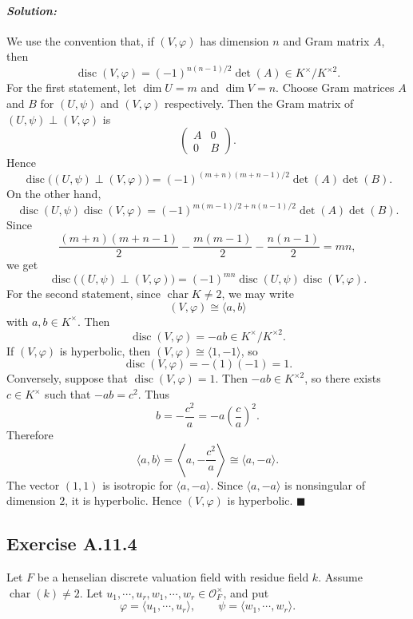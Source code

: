 \documentclass[12pt, a4paper]{article}
\newenvironment{solution}
  {\paragraph{\textit{Solution:}}\par\medskip}
  {\hfill$\blacksquare$\vspace{0.1cm}}
\begin{document}
\begin{solution}
    We use the convention that, if $(V,\varphi)$ has dimension $n$ and Gram matrix $A$, then \[ \operatorname{disc}(V,\varphi) = (-1)^{n(n-1)/2}\det(A) \in K^\times/K^{\times 2}. \] For the first statement, let $\dim U=m$ and $\dim V=n$. Choose Gram matrices $A$ and $B$ for $(U,\psi)$ and $(V,\varphi)$ respectively. Then the Gram matrix of $(U,\psi)\perp (V,\varphi)$ is \[ \begin{pmatrix} A & 0\\ 0 & B \end{pmatrix}. \] Hence \[ \operatorname{disc}\bigl((U,\psi)\perp (V,\varphi)\bigr) = (-1)^{(m+n)(m+n-1)/2}\det(A)\det(B). \] On the other hand, \[ \operatorname{disc}(U,\psi)\operatorname{disc}(V,\varphi) = (-1)^{m(m-1)/2+n(n-1)/2}\det(A)\det(B). \] Since \[ \frac{(m+n)(m+n-1)}{2} - \frac{m(m-1)}{2} - \frac{n(n-1)}{2} = mn, \] we get \[ \operatorname{disc}\bigl((U,\psi)\perp (V,\varphi)\bigr) = (-1)^{mn} \operatorname{disc}(U,\psi)\operatorname{disc}(V,\varphi). \] For the second statement, since $\operatorname{char}K\neq 2$, we may write \[ (V,\varphi)\cong \langle a,b\rangle \] with $a,b\in K^\times$. Then \[ \operatorname{disc}(V,\varphi)=-ab\in K^\times/K^{\times 2}. \] If $(V,\varphi)$ is hyperbolic, then $(V,\varphi)\cong \langle 1,-1\rangle$, so \[ \operatorname{disc}(V,\varphi)=-(1)(-1)=1. \] Conversely, suppose that $\operatorname{disc}(V,\varphi)=1$. Then $-ab\in K^{\times 2}$, so there exists $c\in K^\times$ such that $-ab=c^2$. Thus \[ b=-\frac{c^2}{a}=-a\left(\frac{c}{a}\right)^2. \] Therefore \[ \langle a,b\rangle = \left\langle a,-\frac{c^2}{a}\right\rangle \cong \langle a,-a\rangle. \] The vector $(1,1)$ is isotropic for $\langle a,-a\rangle$. Since $\langle a,-a\rangle$ is nonsingular of dimension $2$, it is hyperbolic. Hence $(V,\varphi)$ is hyperbolic.
\end{solution}

\subsection*{Exercise A.11.4}

Let $F$ be a henselian discrete valuation field with residue field $k$. Assume $\operatorname{char}(k)\neq 2$. Let $u_1,\cdots,u_r,w_1,\cdots,w_r\in \mathcal{O}_F^{\times}$, and put
\[
    \varphi=\langle u_1,\cdots,u_r\rangle,
    \qquad
    \psi=\langle w_1,\cdots,w_r\rangle.
\]
\end{document}
